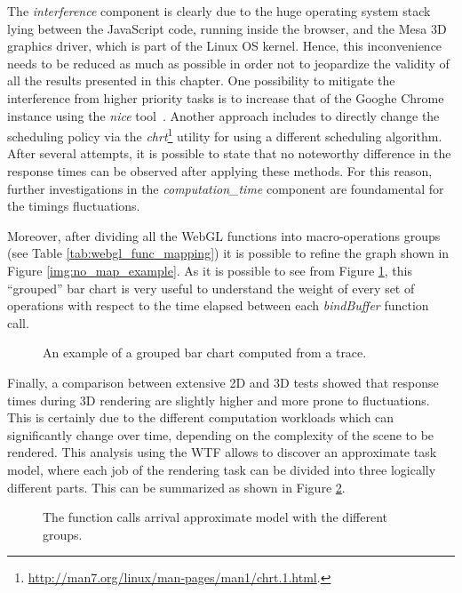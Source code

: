 The \emph{interference} component is clearly due to the huge operating system
stack lying between the JavaScript code, running inside the
browser, and the Mesa 3D graphics driver, which is part of the Linux OS kernel.
Hence, this inconvenience needs to be reduced as much as possible in order not to jeopardize the
validity of all the results presented in this chapter. One possibility to mitigate
the interference from higher priority tasks is to increase that of
the Googhe Chrome instance using the \emph{nice} tool~\cite{aas2005understanding}.
Another approach includes to directly change the scheduling policy via the
\emph{chrt}\footnote{\url{http://man7.org/linux/man-pages/man1/chrt.1.html}.}
utility for using a different scheduling algorithm. After several attempts,
it is possible to state that no
noteworthy difference in the response times can be observed after applying these
methods. For this reason, further investigations in the \emph{computation\_time}
component are foundamental for the timings fluctuations.

Moreover, after dividing all the WebGL functions into macro-operations groups
(see Table \ref{tab:webgl_func_mapping}) it is possible to refine the graph shown
in Figure \ref{img:no_map_example}. As it is possible to see from Figure
\ref{img:no_map_groups}, this ``grouped'' bar chart is very useful to understand
the weight of every set of operations with respect to the time elapsed between
each \emph{bindBuffer} function call.
\begin{figure}[!htb]
    \caption{An example of a grouped bar chart computed from a trace.}
    \label{img:no_map_groups}
\end{figure}

Finally, a comparison between extensive 2D and 3D tests showed that response times
during 3D rendering are slightly higher and more prone to fluctuations. This is
certainly due to the different computation workloads which can significantly change
over time, depending on the complexity of the scene to be rendered.
This analysis using the WTF allows to discover an approximate task model, where
each job of the rendering task can be divided into three logically different
parts. This can be summarized as shown in Figure \ref{img:call_arrival}.

\begin{figure}[!htb]
    \caption{The function calls arrival approximate model with the different groups.}
    \label{img:call_arrival}
\end{figure}


